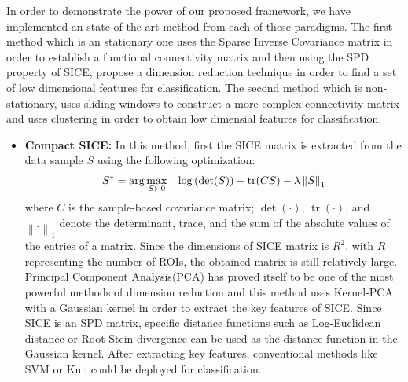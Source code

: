 \documentclass[journal]{IEEEtran}
\newcommand\norm[1]{\left\lVert#1\right\rVert}
\begin{document}
	In order to demonstrate the power of our proposed framework, we have implemented an state of the art method from each of these paradigms. The first method which is an stationary one uses the Sparse Inverse Covariance matrix in order to establish a functional connectivity matrix and then using the SPD property of SICE, propose a dimension reduction technique in order to find a set of low dimensional features for classification. The second method which is non-stationary, uses sliding windows to  construct a more complex connectivity matrix and uses clustering in order to obtain low dimensial features for classification.     
	
	
	\begin{itemize}
		\item \textbf{Compact SICE:}
		In this method, first the SICE matrix is extracted from the data sample $S$ using the following optimization: 
		\begin{align}
		S^* = \operatorname{arg} \max\limits_{S\succ 0} \hspace{3mm} \log \left( \det(S) \right) - \operatorname{tr}(CS) - \lambda \norm{S}_1
		\end{align}
		where $C$ is the sample-based covariance matrix; $\det(·)$, $\operatorname{tr}(·)$,
		and $\norm{.}_1$ denote the determinant, trace, and the sum of the absolute values of the entries of a matrix. Since the dimensions of SICE matrix is $R^2$, with $R$ representing the number of ROIs, the obtained matrix is still relatively large. Principal Component Analysis(PCA) has proved itself to be one of the most powerful methods of dimension reduction and this method uses Kernel-PCA with a Gaussian kernel in order to extract the key features of SICE.
		Since SICE is an SPD matrix, specific distance functions such as Log-Euclidean distance or Root Stein divergence can be used as the distance function in the Gaussian kernel.
		After extracting key features, conventional methods like SVM or Knn could be deployed for classification.
		

\end{itemize}
\end{document}
